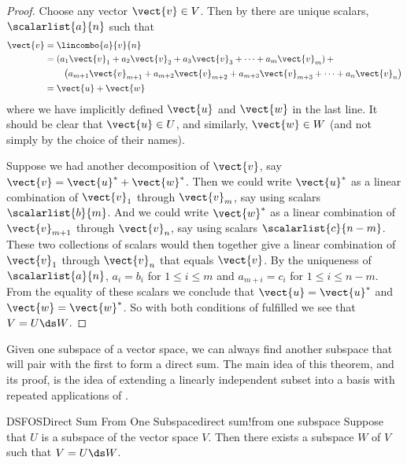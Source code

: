 \begin{proof}
Choose any vector $\vect{v}\in V$.  Then by  there are unique scalars, $\scalarlist{a}{n}$ such that
%
\begin{align*}
\vect{v}
&=\lincombo{a}{v}{n}\\
&=\left(a_1\vect{v}_1+a_2\vect{v}_2+a_3\vect{v}_3+\dots+a_m\vect{v}_m\right)+\\
&\quad\quad\left(a_{m+1}\vect{v}_{m+1}+a_{m+2}\vect{v}_{m+2}+a_{m+3}\vect{v}_{m+3}+\dots+a_n\vect{v}_n\right)\\
&=\vect{u}+\vect{w}
\end{align*}
%
where we have implicitly defined $\vect{u}$ and $\vect{w}$ in the last line.  It should be clear that $\vect{u}\in{U}$, and similarly, $\vect{w}\in{W}$ (and not simply by the choice of their names).\par
%
Suppose we had another decomposition of $\vect{v}$, say $\vect{v}=\vect{u}^\ast+\vect{w}^\ast$.  Then we could write $\vect{u}^\ast$ as a linear combination of $\vect{v}_1$ through $\vect{v}_m$, say using scalars $\scalarlist{b}{m}$.  And we could write $\vect{w}^\ast$ as a linear combination of $\vect{v}_{m+1}$ through $\vect{v}_n$, say using scalars $\scalarlist{c}{n-m}$.  These two collections of scalars would then together give a linear combination of $\vect{v}_1$ through $\vect{v}_n$  that  equals $\vect{v}$.  By the uniqueness of $\scalarlist{a}{n}$, $a_i=b_i$ for $1\leq i\leq m$ and $a_{m+i}=c_{i}$ for $1\leq i\leq n-m$.  From the equality of these scalars we conclude that $\vect{u}=\vect{u}^\ast$ and $\vect{w}=\vect{w}^\ast$.  So with both conditions of  fulfilled we see that $V=U\ds W$.
\end{proof}
%
Given one subspace of a vector space, we can always find another subspace that will pair with the first to form a direct sum.  The main idea of this theorem, and its proof, is the idea of extending a linearly independent subset into a basis with repeated applications of .
%
\begin{theorem}{DSFOS}{Direct Sum From One Subspace}{direct sum!from one subspace}
Suppose that $U$ is a subspace of the vector space $V$.  Then there exists a subspace $W$ of $V$ such that $V=U\ds W$.
\end{theorem}
%
%
